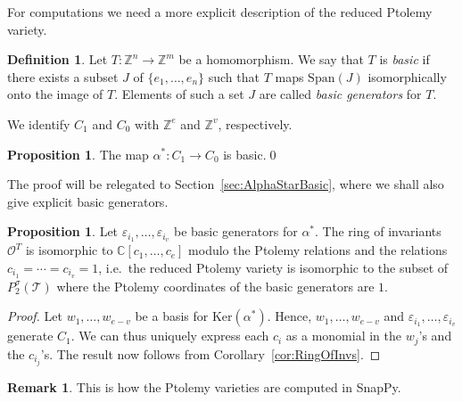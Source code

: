 \documentclass[12pt]{amsart}
\theoremstyle{definition}
\newtheorem{proposition}[theorem]{Proposition}
\newtheorem{definition}[theorem]{Definition}
\newtheorem{remark}[theorem]{Remark}
\numberwithin{equation}{section}
\newcommand{\Span}{\operatorname{Span}}
\def\Z{\mathbb{Z}}
\def\C{\mathbb{C}}
\def\T{\mathcal{T}}
\def\Ker{\mathrm{Ker}}
\def\Imag{\mathrm{Im}}
\def\Span{\mathrm{Span}}
\begin{document}
For computations we need a more explicit description of the reduced Ptolemy variety.
\begin{definition}
Let $T\colon \Z^n\to\Z^m$ be a homomorphism. We say that $T$ is \emph{basic} if there exists a subset $J$ of $\{e_1,\dots,e_n\}$ such that $T$ maps $\Span(J)$ isomorphically onto the image of $T$. Elements of such a set $J$ are called \emph{basic generators} for $T$.
\end{definition}
 We identify $C_1$ and $C_0$ with $\Z^e$ and $\Z^v$, respectively.
\begin{proposition}\label{prop:Basic}
The map $\alpha^*\colon C_1\to C_0$ is basic.\qed
\end{proposition}
The proof will be relegated to Section~\ref{sec:AlphaStarBasic}, where we shall also give explicit basic generators.
\begin{proposition}\label{prop:ReducedPtolemyVariety}
Let $\varepsilon_{i_1},\dots,\varepsilon_{i_v}$ be basic generators for $\alpha^*$. 
The ring of invariants $\mathcal O^T$ is isomorphic to $\C[c_1,\dots,c_e]$ modulo the Ptolemy relations and the relations $c_{i_1}=\cdots=c_{i_v}=1$, i.e.~the reduced Ptolemy variety is isomorphic to the subset of $P_2^\sigma(\T)$ where the Ptolemy coordinates of the basic generators are $1$.
\end{proposition}
\begin{proof}
Let $w_1,\dots,w_{e-v}$ be a basis for $\Ker(\alpha^*)$. Hence, $w_1,\dots,w_{e-v}$ and $\varepsilon_{i_1},\dots,\varepsilon_{i_v}$ generate $C_1$. We can thus uniquely express each $c_i$ as a monomial in the $w_j$'s and the $c_{i_j}$'s. The result now follows from Corollary~\ref{cor:RingOfInvs}.
\end{proof}

\begin{remark}
This is how the Ptolemy varieties are computed in SnapPy.
\end{remark}
\end{document}

